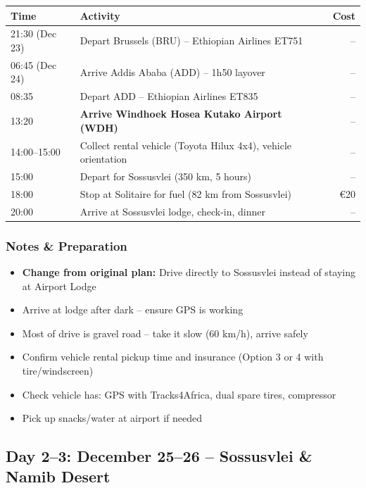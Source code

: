 \documentclass[11pt]{article}
\begin{document}
\begin{tabular}{llr}
\toprule
\textbf{Time} & \textbf{Activity} & \textbf{Cost} \\
\midrule
21:30 (Dec 23) & Depart Brussels (BRU) -- Ethiopian Airlines ET751 & -- \\
06:45 (Dec 24) & Arrive Addis Ababa (ADD) -- 1h50 layover & -- \\
08:35 & Depart ADD -- Ethiopian Airlines ET835 & -- \\
13:20 & \textbf{Arrive Windhoek Hosea Kutako Airport (WDH)} & -- \\
14:00--15:00 & Collect rental vehicle (Toyota Hilux 4x4), vehicle orientation & -- \\
15:00 & Depart for Sossusvlei (350 km, 5 hours) & -- \\
18:00 & Stop at Solitaire for fuel (82 km from Sossusvlei) & €20 \\
20:00 & Arrive at Sossusvlei lodge, check-in, dinner & -- \\
\bottomrule
\end{tabular}

\subsubsection{Notes \& Preparation}

\begin{itemize}
    \item \textbf{Change from original plan:} Drive directly to Sossusvlei instead of staying at Airport Lodge
    \item Arrive at lodge after dark -- ensure GPS is working
    \item Most of drive is gravel road -- take it slow (60 km/h), arrive safely
    \item Confirm vehicle rental pickup time and insurance (Option 3 or 4 with tire/windscreen)
    \item Check vehicle has: GPS with Tracks4Africa, dual spare tires, compressor
    \item Pick up snacks/water at airport if needed
\end{itemize}

\clearpage
\subsection{Day 2--3: December 25--26 -- Sossusvlei \& Namib Desert}
\end{document}
